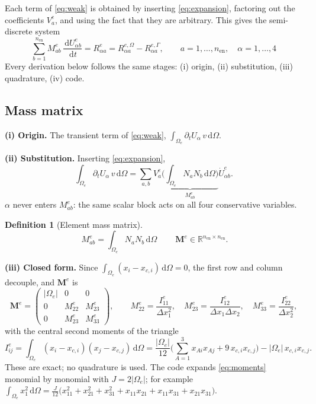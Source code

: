 \documentclass[11pt,a4paper]{article}
\theoremstyle{remark}
\theoremstyle{definition}
\newtheorem{definition}{Definition}
\newcommand{\dd}{\,\mathrm{d}}
\newcommand{\M}{\mathbf{M}}
\begin{document}
Each term of \eqref{eq:weak} is obtained by inserting \eqref{eq:expansion}, factoring out the coefficients $V^e_a$, and using the fact that they are arbitrary. This gives the semi-discrete system
\begin{equation}\label{eq:semi}
\boxed{\ \sum_{b=1}^{n_{\mathrm{en}}}M^e_{ab}\,\frac{\dd U^e_{\alpha b}}{\dd t}=R^e_{\alpha a}=R^{e,\Omega}_{\alpha a}-R^{e,\Gamma}_{\alpha a},\qquad a=1,\dots,n_{\mathrm{en}},\quad\alpha=1,\dots,4\ }
\end{equation}
Every derivation below follows the same stages: (i) origin, (ii) substitution, (iii) quadrature, (iv) code.

\subsection{Mass matrix}\label{sec:mass}
\textbf{(i) Origin.} The transient term of \eqref{eq:weak}, $\int_{\Omega_e}\partial_tU_\alpha\,v\dd\Omega$.

\textbf{(ii) Substitution.} Inserting \eqref{eq:expansion},
\[
\int_{\Omega_e}\partial_tU_\alpha\,v\dd\Omega=\sum_{a,b}V^e_a\underbrace{\Big(\int_{\Omega_e}N_aN_b\dd\Omega\Big)}_{M^e_{ab}}\dot U^e_{\alpha b}.
\]
$\alpha$ never enters $M^e_{ab}$: the same scalar block acts on all four conservative variables.

\begin{definition}[Element mass matrix]
\begin{equation}\label{eq:massdef}
\boxed{\ M^e_{ab}=\int_{\Omega_e}N_aN_b\dd\Omega\ }\qquad \M^e\in\mathbb{R}^{n_{\mathrm{en}}\times n_{\mathrm{en}}}.
\end{equation}
\end{definition}

\textbf{(iii) Closed form.} Since $\int_{\Omega_e}(x_i-x_{c,i})\dd\Omega=0$, the first row and column decouple, and $\M^e$ is
\begin{equation}\label{eq:mass}
\M^e=\begin{pmatrix}|\Omega_e|&0&0\\0&M^e_{22}&M^e_{23}\\0&M^e_{23}&M^e_{33}\end{pmatrix},\qquad
M^e_{22}=\frac{I^e_{11}}{\Delta x_1^2},\quad M^e_{23}=\frac{I^e_{12}}{\Delta x_1\Delta x_2},\quad M^e_{33}=\frac{I^e_{22}}{\Delta x_2^2},
\end{equation}
with the central second moments of the triangle
\begin{equation}\label{eq:moments}
I^e_{ij}=\int_{\Omega_e}(x_i-x_{c,i})(x_j-x_{c,j})\dd\Omega=\frac{|\Omega_e|}{12}\Big(\sum_{A=1}^3x_{Ai}x_{Aj}+9\,x_{c,i}x_{c,j}\Big)-|\Omega_e|\,x_{c,i}x_{c,j}.
\end{equation}
These are exact; no quadrature is used. The code expands \eqref{eq:moments} monomial by monomial with $J=2|\Omega_e|$; for example $\int_{\Omega_e}x_1^2\dd\Omega=\frac{J}{12}\big(x_{11}^2+x_{21}^2+x_{31}^2+x_{11}x_{21}+x_{11}x_{31}+x_{21}x_{31}\big)$.
\end{document}
